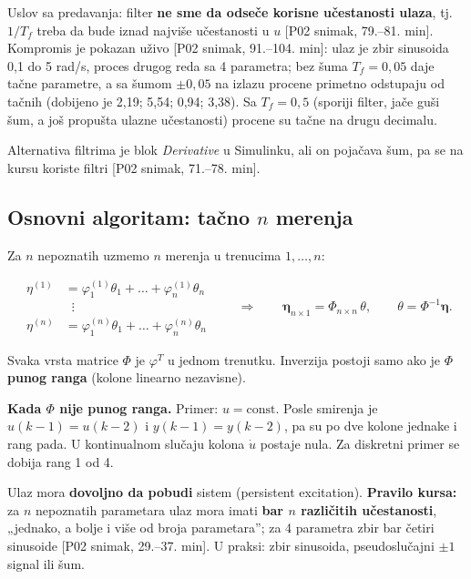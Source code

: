 \documentclass[11pt,a4paper,parskip=half,headsepline,numbers=noenddot]{scrartcl}
\DeclareRobustCommand{\izvor}[1]{{\small\color{izvorC}[#1]}}
\begin{document}
Uslov sa predavanja: filter \textbf{ne sme da odseče korisne učestanosti ulaza}, tj. \(1/T_f\) treba da bude iznad najviše učestanosti u \(u\) \izvor{P02 snimak, 79.--81. min}. Kompromis je pokazan uživo \izvor{P02 snimak, 91.--104. min}: ulaz je zbir sinusoida 0,1 do 5 rad/s, proces drugog reda sa 4 parametra; bez šuma \(T_f = 0{,}05\) daje tačne parametre, a sa šumom \(\pm 0{,}05\) na izlazu procene primetno odstupaju od tačnih (dobijeno je 2,19; 5,54; 0,94; 3,38). Sa \(T_f = 0{,}5\) (sporiji filter, jače guši šum, a još propušta ulazne učestanosti) procene su tačne na drugu decimalu.

Alternativa filtrima je blok \emph{Derivative} u Simulinku, ali on pojačava šum, pa se na kursu koriste filtri \izvor{P02 snimak, 71.--78. min}.

\subsection{\texorpdfstring{Osnovni algoritam: tačno \(n\) merenja}{Osnovni algoritam: tačno n merenja}}

Za \(n\) nepoznatih uzmemo \(n\) merenja u trenucima \(1, \dots, n\):

\[
\begin{aligned}
\eta^{(1)} &= \varphi_1^{(1)}\theta_1 + \dots + \varphi_n^{(1)}\theta_n\\
&\;\;\vdots\\
\eta^{(n)} &= \varphi_1^{(n)}\theta_1 + \dots + \varphi_n^{(n)}\theta_n
\end{aligned}
\qquad\Longrightarrow\qquad
\boldsymbol\eta_{n\times 1} = \Phi_{n\times n}\,\theta,\qquad \theta = \Phi^{-1}\boldsymbol\eta .
\]

Svaka vrsta matrice \(\Phi\) je \(\varphi^T\) u jednom trenutku. Inverzija postoji samo ako je \(\Phi\) \textbf{punog ranga} (kolone linearno nezavisne).

\textbf{Kada \(\Phi\) nije punog ranga.} Primer: \(u = \text{const}\). Posle smirenja je \(u(k-1) = u(k-2)\) i \(y(k-1) = y(k-2)\), pa su po dve kolone jednake i rang pada. U kontinualnom slučaju kolona \(\dot u\) postaje nula. Za diskretni primer se dobija rang 1 od 4.

\begin{kljucna}
Ulaz mora \textbf{dovoljno da pobudi} sistem (persistent excitation). \textbf{Pravilo kursa:} za \(n\) nepoznatih parametara ulaz mora imati \textbf{bar \(n\) različitih učestanosti}, „jednako, a bolje i više od broja parametara''; za 4 parametra zbir bar četiri sinusoide \izvor{P02 snimak, 29.--37. min}. U praksi: zbir sinusoida, pseudoslučajni \(\pm 1\) signal ili šum.
\end{kljucna}
\end{document}

